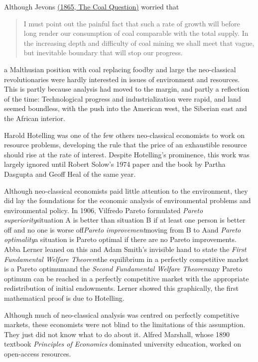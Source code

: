 Although Jevons \href{https://www.econlib.org/library/YPDBooks/Jevons/jvnCQ.html}{(1865, The Coal Question)} worried that
\begin{quote}
    I must point out the painful fact that such a rate of growth will before long render our consumption of coal comparable with the total supply. In the increasing depth and difficulty of coal mining we shall meet that vague, but inevitable boundary that will stop our progress.
\end{quote}
a Malthusian position with coal replacing food\textemdash by and large the neo-classical revolutionaries were hardly interested in issues of environment and resources. This is partly because analysis had moved to the margin, and partly a reflection of the time: Technological progress and industrialization were rapid, and land seemed boundless, with the push into the American west, the Siberian east and the African interior. 

Harold Hotelling was one of the few others neo-classical economists to work on resource problems, developing the rule that the price of an exhaustible resource should rise at the rate of interest. Despite Hotelling's prominence, this work was largely ignored until Robert Solow's 1974 paper and the book by Partha Dasgupta and Geoff Heal of the same year.

Although neo-classical economists paid little attention to the environment, they did lay the foundations for the economic analysis of environmental problems and environmental policy. In 1906, Vilfredo Pareto formulated \emph{Pareto superiority}\textemdash situation A is better than situation B if at least one person is better off and no one is worse off\textemdash \emph{Pareto improvement}\textemdash moving from B to A\textemdash and \emph{Pareto optimality}\textemdash a situation is Pareto optimal if there are no Pareto improvements. Abba Lerner leaned on this and Adam Smith's invisible hand to state the \emph{First Fundamental Welfare Theorem}\textemdash the equilibrium in a perfectly competitive market is a Pareto optimum\textemdash and the \emph{Second Fundamental Welfare Theorem}\textemdash any Pareto optimum can be reached in a perfectly competitive market with the appropriate redistribution of initial endowments. Lerner showed this graphically, the first mathematical proof is due to Hotelling.

Although much of neo-classical analysis was centred on perfectly competitive markets, these economists were not blind to the limitations of this assumption. They just did not know what to do about it. Alfred Marshall, whose 1890 textbook \emph{Principles of Economics} dominated university education, worked on open-access resources.

